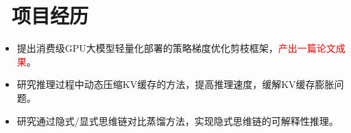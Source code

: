 \documentclass{resume}
\begin{document}



\vspace{-1mm}
\section{\faTasks\ 项目经历}
\begin{itemize}
  \item 提出消费级GPU大模型轻量化部署的策略梯度优化剪枝框架，\textcolor{red}{产出一篇论文成果}。
  \item 研究推理过程中动态压缩KV缓存的方法，提高推理速度，缓解KV缓存膨胀问题。
  \item 研究通过隐式/显式思维链对比蒸馏方法，实现隐式思维链的可解释性推理。
\end{itemize}
\end{document}
